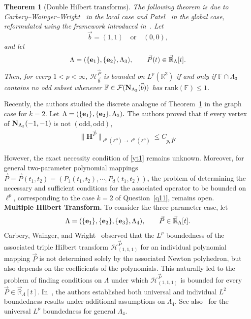 \documentclass[11 pt,letterpaper]{amsart}
\theoremstyle{plain}
\newtheorem{theorem}{Theorem}\numberwithin{theorem}{section}
\theoremstyle{definition}
\theoremstyle{remark} \theoremstyle{exam} \theoremstyle{ob}
\numberwithin{equation}{section}
\begin{document}
\begin{theorem}[Double Hilbert transforms]
	\label{DCP}
	The following theorem is due to
	Carbery--Wainger--Wright~\cite{CWW} in the local case and
	Patel~\cite{P2} in the global case, reformulated using the framework
	introduced in~\cite{K}.
	Let
	\[
	\vec b=(1,1)
	\quad\text{or}\quad
	(0,0),
	\]
	and let
	\[
	\Lambda=(\{{\bf e}_1\},\{{\bf e}_2\},\Lambda_3),
	\qquad
	\vec P(t)\in\vec{\mathbb R}_{\Lambda}[t].
	\]
Then, for every $1<p<\infty$,
$\mathcal H_{\vec b}^{\vec P}$ is bounded on $L^p(\mathbb R^3)$
	if and only if
	$\mathbb F\cap\Lambda_3$
	contains no odd subset whenever
	$
	\mathbb F\in
	\mathcal F({\bf N}_{\Lambda_3}(\vec b))
	$
	has     $\text{rank}(\mathbb{F})\le 1$.
\end{theorem}



Recently, the authors \cite{KS}   studied the  discrete
analogue of Theorem~\ref{DCP} in the graph case for $k=2$.
Let
$\Lambda=(\{{\bf e}_1\},\{{\bf e}_2\},\Lambda_3).$
The authors proved that if every vertex of
${\bf N}_{\Lambda_3}(-1,-1)$
is not $(\mathrm{odd},\mathrm{odd})$, 
\begin{align}\label{yt1}
\|\textbf{H}^{\vec P}\|_{\ell^p(\mathbb Z^3)\rightarrow\ell^p(\mathbb Z^3)}
\le C_{p,\vec P}.	
\end{align}

However, the exact necessity condition of \eqref{yt1} remains unknown. Moreover, for general two-parameter polynomial mappings $\vec{P}=\vec{P}(t_1,t_2)=(P_1(t_1,t_2),\cdots,P_{d}(t_1,t_2))$, the problem of determining the necessary and sufficient conditions for   the associated operator to be bounded on $\ell^p$, corresponding to the case $k=2$ of Question~\ref{q11}, remains open.
\\


\noindent\textbf{Multiple Hilbert Transform.}
To consider the three-parameter case, let
\[
\Lambda=(\{{\bf e}_1\},\{{\bf e}_2\},\{{\bf e}_3\},\Lambda_4),
\qquad
\vec P\in\vec{\mathbb R}_{\Lambda}[t].
\]
Carbery, Wainger, and Wright~\cite{CWW2}  observed that the
$L^p$ boundedness of the associated triple Hilbert transform
$\bm{\mathcal{H}}^{\vec P}_{(1,1,1)}$
for an individual polynomial mapping $\vec P$ is not determined solely
by the associated Newton polyhedron, but also depends on the
coefficients of the polynomials. This naturally led to the problem of
finding conditions on $\Lambda$ under which
$\bm{\mathcal{H}}^{\vec P}_{(1,1,1)}$
is bounded for every
$\vec P\in\vec{\mathbb R}_{\Lambda}[t]$.
In~\cite{CWW2}, the authors established both universal and individual
$L^2$ boundedness results under additional assumptions on $\Lambda_4$.
See also~\cite{CHKY} for  the   universal $L^p$ boundedness  for general $\Lambda_4$.
\end{document}
